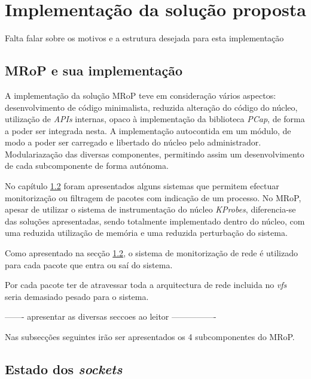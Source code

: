 \chapter{Implementação da solução proposta}
\label{cap:Implementacao}

Falta falar sobre os motivos e a estrutura desejada para esta implementação

\section{MRoP e sua implementação}
\label{sec:mrop_implementation}

A implementação da solução MRoP teve em consideração vários aspectos: desenvolvimento de código minimalista, reduzida alteração do código do núcleo, utilização de \textit{APIs} internas, opaco à implementação da biblioteca \textit{PCap}, de forma a poder ser integrada nesta.
A implementação autocontida em um módulo, de modo a poder ser carregado e libertado do núcleo pelo administrador.
Modulariazação das diversas componentes, permitindo assim um desenvolvimento de cada subcomponente de forma autónoma.

No capítulo \ref{} foram apresentados alguns sistemas que permitem efectuar monitorização ou filtragem de pacotes com indicação de um processo.
No MRoP, apesar de utilizar o sistema de instrumentação do núcleo \textit{KProbes}, diferencia-se das soluções apresentadas, sendo totalmente implementado dentro do núcleo, com uma reduzida utilização de memória e uma reduzida perturbação do sistema.

Como apresentado na secção \ref{}, o sistema de monitorização de rede é utilizado para cada pacote que entra ou saí do sistema.






Por cada pacote ter de atravessar toda a arquitectura de rede incluida no \textit{vfs} seria demasiado pesado para o sistema.

------- apresentar as diversas seccoes ao leitor ----------------

Nas subsecções seguintes irão ser apresentados os 4 subcomponentes do MRoP.


\section{Estado dos \textit{sockets}}

